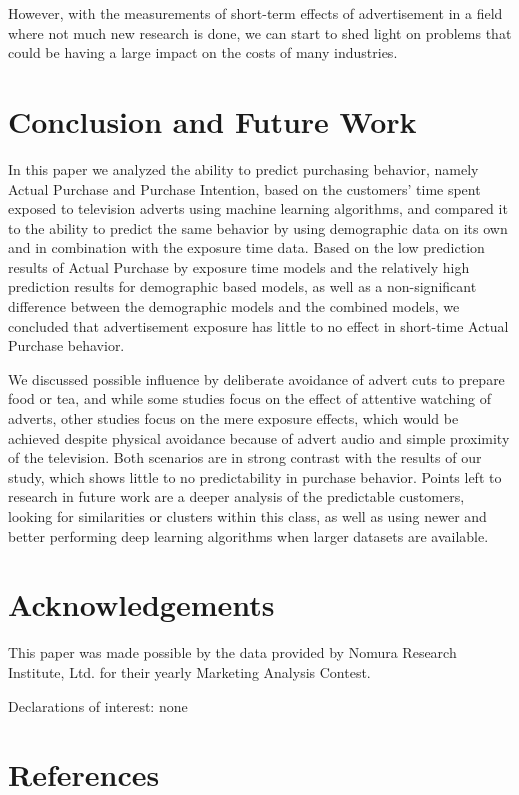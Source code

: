 \documentclass[review]{elsarticle}
\begin{document}
However, with the measurements of short-term effects of advertisement in a field where not much new research is done, we can start to shed light on problems that could be having a large impact on the costs of many industries.

\section{Conclusion and Future Work}
\label{conclusion}

In this paper we analyzed the ability to predict purchasing behavior, namely Actual Purchase and Purchase Intention, based on the customers' time spent exposed to television adverts using machine learning algorithms, and compared it to the ability to predict the same behavior by using demographic data on its own and in combination with the exposure time data. Based on the low prediction results of Actual Purchase by exposure time models and the relatively high prediction results for demographic based models, as well as a non-significant difference between the demographic models and the combined models, we concluded that advertisement exposure has little to no effect in short-time Actual Purchase behavior. 

We discussed possible influence by deliberate avoidance of advert cuts to prepare food or tea, and while some studies focus on the effect of attentive watching of adverts, other studies focus on the mere exposure effects, which would be achieved despite physical avoidance because of advert audio and simple proximity of the television. Both scenarios are in strong contrast with the results of our study, which shows little to no predictability in purchase behavior. Points left to research in future work are a deeper analysis of the predictable customers, looking for similarities or clusters within this class, as well as using newer and better performing deep learning algorithms when larger datasets are available. 

\section{Acknowledgements}

This paper was made possible by the data provided by Nomura Research Institute, Ltd. for their yearly Marketing Analysis Contest.

Declarations of interest: none

\section*{References}
\end{document}
